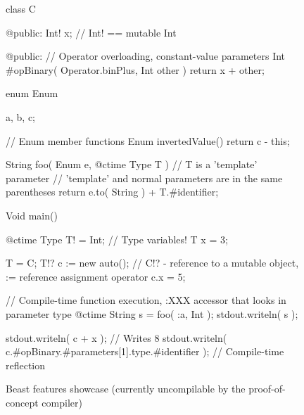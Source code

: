 \documentclass{ExcelAtFIT}
\begin{document}




\begin{figure}[tbh]
	\begin{code}
class C {
	
@public:
	Int! x; // Int! == mutable Int
	
@public:
	// Operator overloading, constant-value parameters
	Int #opBinary(
		Operator.binPlus,
		Int other
		)
	{
		return x + other;
	}
	
}

enum Enum {
	a, b, c;
	
	// Enum member functions
	Enum invertedValue() {
		return c - this;	
	}
}

String foo( Enum e, @ctime Type T ) {
	// T is a 'template' parameter
	// 'template' and normal parameters are in the same parentheses
	return e.to( String ) + T.#identifier; 
}

Void main() {
	@ctime Type T! = Int; // Type variables!
	T x = 3;
	
	T = C;
	T!? c := new auto(); // C!? - reference to a mutable object, := reference assignment operator
	c.x = 5;
	
	// Compile-time function execution, :XXX accessor that looks in parameter type
	@ctime String s = foo( :a, Int );
	stdout.writeln( s );
	
	stdout.writeln( c + x ); // Writes 8
	stdout.writeln( c.#opBinary.#parameters[1].type.#identifier ); // Compile-time reflection
}
	\end{code}
	\caption{Beast features showcase (currently uncompilable by the proof-of-concept compiler)}
	\label{fig:beastShowcase}
\end{figure}
\end{document}
